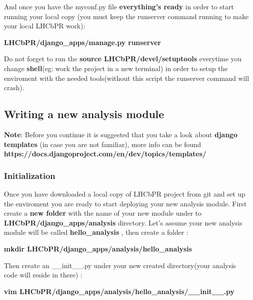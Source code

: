 \documentclass{lhcbnote}
\begin{document}
\vspace{2 mm}

And once you have the myconf.py file {\bf everything's ready} in order to start running your local copy (you must keep the runserver command running to make your local LHCbPR work):

\vspace{2 mm}

{\bf LHCbPR/django\_apps/manage.py runserver}

\vspace{2 mm}

Do not forget to run the {\bf source LHCbPR/devel/setuptools} everytime you change {\bf shell}(eg: work the project in a new terminal) 
in order to setup the enviroment with the needed tools(without this script the runserver command will crash).

\subsection{Writing a new analysis module}

{\bf Note}: Before you continue it is suggested that you take a look about {\bf django templates} (in case you are not familiar), more info can be found {\bf https://docs.djangoproject.com/en/dev/topics/templates/}

\subsubsection{Initialization}

Once you have downloaded a local copy of LHCbPR project from git and set up the enviroment you are ready to start deploying your new analysis module.
First create a {\bf new folder} with the name of your new module under to {\bf LHCbPR/django\_apps/analysis} directory. Let's assume your new analysis module will be called {\bf hello\_analysis} , then create a folder :

\vspace{2 mm}

{\bf mkdir LHCbPR/django\_apps/analysis/hello\_analysis}

\vspace{2 mm}

Then create an \_\_init\_\_.py under your new created directory(your analysis code will reside in there) :

\vspace{2 mm}

{\bf vim LHCbPR/django\_apps/analysis/hello\_analysis/\_\_init\_\_.py}
\end{document}
